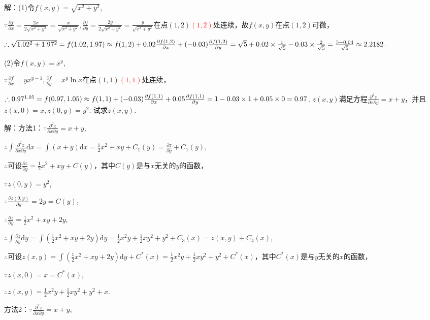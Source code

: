 \documentclass[12pt,UTF8]{ctexart}
\begin{document}
\begin{enumerate}
解：(1)令$f(x,y)=\sqrt{x^2+y^2}$,

$\because\frac{\partial f}{\partial x}=\frac{2x}{2\sqrt{x^2+y^2}}=\frac x{\sqrt{x^2+y^2}},\frac{\partial f}{\partial y}=\frac{2y}{2\sqrt{x^2+y^2}}=\frac y{\sqrt{x^2+y^2}}$在点$(1,2)$\textcolor{red}{$(1,2)$}处连续，故$f(x,y)$在点$(1,2)$可微，

$\therefore\sqrt{1.02^2+1.97^2}=f(1.02,1.97)\approx f(1,2)+0.02\frac{\partial f(1,2)}{\partial x}+(-0.03)\frac{\partial f(1,2)}{\partial y}\\
=\sqrt5+0.02\times\frac1{\sqrt5}-0.03\times\frac2{\sqrt5}=\frac{5-0.04}{\sqrt5}\approx2.2182$.

(2)令$f(x,y)=x^y$,

$\because\frac{\partial f}{\partial x}=yx^{y-1},\frac{\partial f}{\partial y}=x^y\ln x$在点$(1,1)$\textcolor{red}{$(1,1)$}处连续，

$\therefore0.97^{1.05}=f(0.97,1.05)\approx f(1,1)+(-0.03)\frac{\partial f(1,1)}{\partial x}+0.05\frac{\partial f(1,1)}{\partial y}\\
=1-0.03\times1+0.05\times0=0.97$.
$z(x,y)$满足方程$\frac{\partial^2z}{\partial x\partial y}=x+y$，并且$z(x,0)=x,z(0,y)=y^2$. 试求$z(x,y)$.

解：方法1：$\because\frac{\partial^2z}{\partial x\partial y}=x+y$,

$\therefore\int\frac{\partial^2z}{\partial x\partial y}\mathrm dx=\int(x+y)\mathrm dx=\frac12x^2+xy+C_1(y)=\frac{\partial z}{\partial y}+C_1(y)$,

$\therefore$可设$\frac{\partial z}{\partial y}=\frac12x^2+xy+C(y)$，其中$C(y)$是与$x$无关的$y$的函数，

$\because z(0,y)=y^2$,

$\therefore\frac{\partial z(0,y)}{\partial y}=2y=C(y)$,

$\therefore\frac{\partial z}{\partial y}=\frac12x^2+xy+2y$,

$\therefore\int\frac{\partial z}{\partial y}\mathrm dy=\int(\frac12x^2+xy+2y)\mathrm dy=\frac12x^2y+\frac12xy^2+y^2+C_3(x)=z(x,y)+C_4(x)$,

$\therefore$可设$z(x,y)=\int(\frac12x^2+xy+2y)\mathrm dy+C^*(x)=\frac12x^2y+\frac12xy^2+y^2+C^*(x)$，其中$C^*(x)$是与$y$无关的$x$的函数，

$\because z(x,0)=x=C^*(x)$,

$\therefore z(x,y)=\frac12x^2y+\frac12xy^2+y^2+x$.

方法2：$\because\frac{\partial^2z}{\partial x\partial y}=x+y$,


\end{enumerate}
\end{document}
